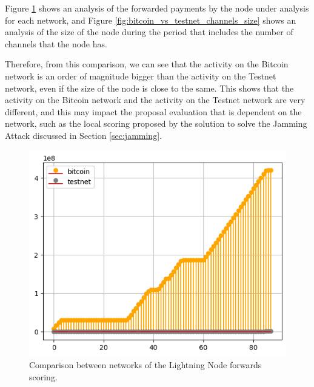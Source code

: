 Figure \ref{fig:bitcoin_vs_testnet_forwards} shows an analysis of the forwarded 
payments by the node under analysis for each network, and Figure \ref{fig:bitcoin_vs_testnet_channels_size} 
shows an analysis of the size of the node during the period that includes the number
of channels that the node has.

Therefore, from this comparison, we can see that the activity on the Bitcoin network is an order of magnitude
bigger than the activity on the Testnet network, even if the size of the node is close to the same. This 
shows that the activity on the Bitcoin network and the activity on the Testnet network are very different,
and this may impact the proposal evaluation that is dependent on the network, such as the local scoring 
proposed by the solution to solve the Jamming Attack discussed in Section \ref{sec:jamming}.

\begin{figure}[H]
    \begin{center}
        \includegraphics[scale=0.7]{imgs/bitcoin_vs_testnet_forwards.png}
    \end{center}
    \caption{Comparison between networks of the Lightning Node forwards scoring.}
    \label{fig:bitcoin_vs_testnet_forwards}
\end{figure}

